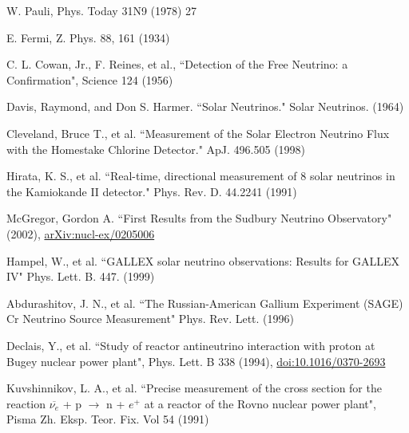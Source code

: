 \clearpage
\newpage
\begin{thebibliography}{20} %
\singlespacing



W. Pauli, Phys. Today 31N9 (1978) 27

E. Fermi, Z. Phys. 88, 161 (1934)

  C. L. Cowan, Jr., F. Reines, et al., ``Detection of the Free Neutrino: a Confirmation", Science 124 (1956)

Davis, Raymond, and Don S. Harmer. ``Solar Neutrinos." Solar Neutrinos. (1964) %

Cleveland, Bruce T., et al. ``Measurement of the Solar Electron Neutrino Flux with the Homestake Chlorine Detector." ApJ. 496.505 (1998) %

Hirata, K. S., et al. ``Real-time, directional measurement of 8 solar neutrinos in the Kamiokande II detector." Phys. Rev. D. 44.2241 (1991) %

McGregor, Gordon A. ``First Results from the Sudbury Neutrino Observatory" (2002), \href{https://arxiv.org/abs/nucl-ex/0205006}{arXiv:nucl-ex/0205006}

Hampel, W., et al. ``GALLEX solar neutrino observations: Results for GALLEX IV" Phys. Lett. B. 447. (1999) %


Abdurashitov, J. N., et al. ``The Russian-American Gallium Experiment (SAGE) Cr Neutrino Source Measurement"  Phys. Rev. Lett. (1996) %

Declais, Y., et al. ``Study of reactor antineutrino interaction with proton at Bugey nuclear power plant", Phys. Lett. B 338 (1994), \href{https://inspirehep.net/record/39502/}{doi:10.1016/0370-2693}

Kuvshinnikov, L. A., et al. ``Precise measurement of the cross section for the reaction $\overline{\nu_e}$ + p $\rightarrow$ n + $e^+$ at a reactor of the Rovno nuclear power plant", Pisma Zh. Eksp. Teor. Fix. Vol 54 (1991)


\end{thebibliography}
